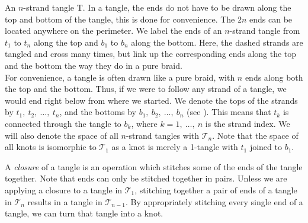 \begin{paper}
{An $n$-strand tangle T.
In a tangle, the ends do not have to be drawn along the top and bottom of the
tangle, this is done for convenience.
The $2n$ ends can be located anywhere on the perimeter.
We label the ends of an $n$-strand tangle from $t_1$ to $t_n$ along the top and
$b_1$ to $b_n$ along the bottom.
Here, the dashed strands are tangled and cross many times, but link up the
corresponding ends along the top and the bottom the way they do in a pure
braid.}\\

For convenience, a tangle is often drawn like a pure braid, with $n$ ends along
both the top and the bottom.
Thus, if we were to follow any strand of a tangle, we would end right below
from where we started.
We denote the tops of the strands by $t_1,~t_2,~\dots,~t_n$, and the
bottoms by $b_1,~b_2,~\dots,~b_n$ (see \figTangle).
This means that $t_k$ is connected through the tangle to $b_k$, where
$k=1,~\dots,~n$ is the strand index.
We will also denote the space of all $n$-strand tangles with $\mathcal{T}_n$.
Note that the space of all knots is isomorphic to $\mathcal{T}_1$ as a knot is
merely a 1-tangle with $t_1$ joined to $b_1$.

A \textit{closure} of a tangle is an operation which stitches some of the ends
of the tangle together.
Note that ends can only be stitched together in pairs.
Unless we are applying a closure to a tangle in $\mathcal{T}_1$, stitching
together a pair of ends of a tangle in $\mathcal{T}_n$ results in a tangle in
$\mathcal{T}_{n-1}$.
By appropriately stitching every single end of a tangle, we can turn that tangle
into a knot.\\


\end{paper}
